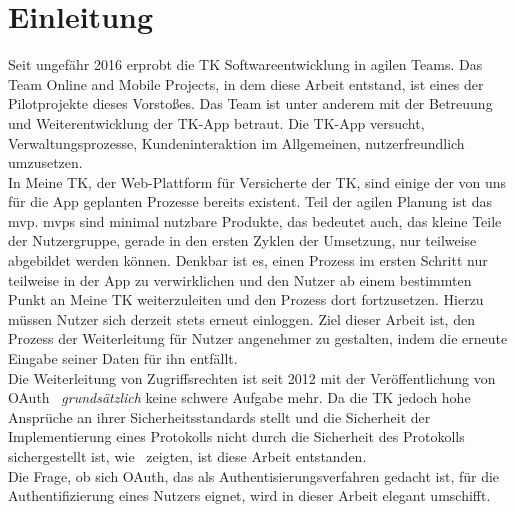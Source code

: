 \chapter{Einleitung}
Seit ungefähr 2016 erprobt die TK Softwareentwicklung in agilen Teams.
Das Team Online and Mobile Projects, in dem diese Arbeit entstand, ist eines der
Pilotprojekte dieses Vorstoßes. Das Team ist unter anderem mit der Betreuung und
Weiterentwicklung der TK-App betraut. Die TK-App versucht, Verwaltungsprozesse,
Kundeninteraktion im Allgemeinen, nutzerfreundlich umzusetzen.\\
In Meine TK, der Web-Plattform für Versicherte der TK, sind einige der von uns
für die App geplanten Prozesse bereits existent. Teil der agilen Planung ist das
\gls{mvp}. \glspl{mvp} sind minimal nutzbare Produkte, das bedeutet auch, das
kleine Teile der Nutzergruppe, gerade in den ersten Zyklen der Umsetzung, nur
teilweise abgebildet werden können. Denkbar ist es, einen Prozess im ersten
Schritt nur teilweise in der App zu verwirklichen und den Nutzer ab einem
bestimmten Punkt an Meine TK weiterzuleiten und den Prozess dort fortzusetzen.
Hierzu müssen Nutzer sich derzeit stets erneut einloggen. Ziel dieser Arbeit
ist, den Prozess der Weiterleitung für Nutzer angenehmer zu gestalten, indem die
erneute Eingabe seiner Daten für ihn entfällt.\\
Die Weiterleitung von Zugriffsrechten ist seit 2012 mit der Veröffentlichung von
\gls{OAuth}~\cite{RFC6749} \textit{grundsätzlich} keine schwere Aufgabe mehr. Da
die TK jedoch hohe Ansprüche an ihrer Sicherheitsstandards stellt und die
Sicherheit der Implementierung eines Protokolls nicht durch die Sicherheit des
Protokolls sichergestellt ist, wie~\cite{Sun.2012,Hu.2014,Yang.2016} zeigten,
ist diese Arbeit entstanden.\\
Die Frage, ob sich OAuth, das als Authentisierungsverfahren gedacht ist, für die
Authentifizierung eines Nutzers eignet, wird in dieser Arbeit elegant umschifft.
